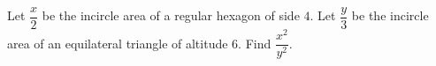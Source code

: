 Let $\dfrac{x}{2}$ be the incircle area of a regular hexagon of side $4$. Let $\dfrac{y}{3}$ be the incircle area of an equilateral triangle of altitude $6$. Find $\dfrac{x^2}{y^2}$.
